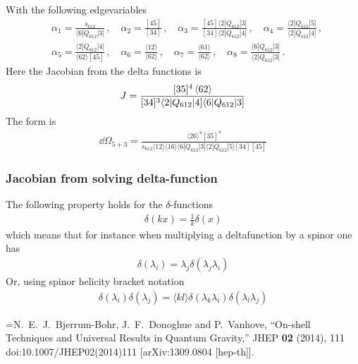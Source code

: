 \documentclass[letter,11pt]{article}
\newcommand{\ab}[1]{\langle #1 \rangle}
\newcommand{\sqb}[1]{[ #1 ]}
\newcommand{\aMs}[3]{\langle #1|#2|#3]}  		%
\newcommand{\sab}[1]{s_{#1}}
\begin{document}
With the following edgevariables
\begin{equation}
	\begin{aligned}
		& \alpha_1 = \frac{\sab{612}}{\aMs{6}{Q_{612}}{3}}\,, \quad \alpha_2 = \frac{[45]}{[34]}\,, \quad \alpha_3 = \frac{[45]\aMs{2}{Q_{612}}{3}}{[34]\aMs{2}{Q_{612}}{4}}\,, \quad \alpha_4 = \frac{\aMs{2}{Q_{612}}{5}}{\aMs{2}{Q_{612}}{4}}\,,\\ 
		&\alpha_5 = \frac{\aMs{2}{Q_{612}}{4}}{\ab{62}[45]}\,, 
		\quad
		\alpha_6 = \frac{\ab{12}}{\ab{62}}\,,\quad \alpha_7 = \frac{\ab{61}}{\ab{62}}\,,\quad
		\alpha_8 =  \frac{\aMs{6}{Q_{612}}{3}}{\aMs{2}{Q_{612}}{3}}\,.
	\end{aligned}
\end{equation}
Here the Jacobian from the delta functions is
\begin{equation}
	\begin{aligned}
		J=\frac{[35]^4\expval{62}}{\sqb{34}^3\aMs{2}{Q_{612}}{4}\aMs{6}{Q_{612}}{3}}
	\end{aligned}
\end{equation}
The form is
\begin{equation}
	\begin{aligned}
		\dd\Omega_{5+3}=\frac{\ab{26}^4 \sqb{35}^4}{s_{612}\ab{12}\ab{16}\aMs{6}{Q_{612}}{3}\aMs{2}{Q_{612}}{5}\sqb{34}\sqb{45}}
	\end{aligned}
\end{equation}
\subsubsection{Jacobian from solving delta-function}
The following property holds for the $\delta$-functions
\begin{equation}
	\begin{aligned}
		\delta(kx)=\frac{1}{k}\delta(x)
	\end{aligned}
\end{equation}
which means that for instance when multiplying a deltafunction by a spinor one has
\begin{equation}
	\begin{aligned}
		\delta(\lambda_i)=\lambda_j\delta(\lambda_j\lambda_i)
	\end{aligned}
\end{equation}
Or, using spinor helicity bracket notation
\begin{equation}
	\begin{aligned}
		\delta(\lambda_i)\delta(\lambda_j)=\ab{kl}\delta(\lambda_k\lambda_i)\delta(\lambda_l\lambda_j)
	\end{aligned}
\end{equation}
\begin{thebibliography}{99}
=N.~E.~J.~Bjerrum-Bohr, J.~F.~Donoghue and P.~Vanhove,
``On-shell Techniques and Universal Results in Quantum Gravity,''
JHEP \textbf{02} (2014), 111
doi:10.1007/JHEP02(2014)111
[arXiv:1309.0804 [hep-th]].

\end{thebibliography}
\end{document}
